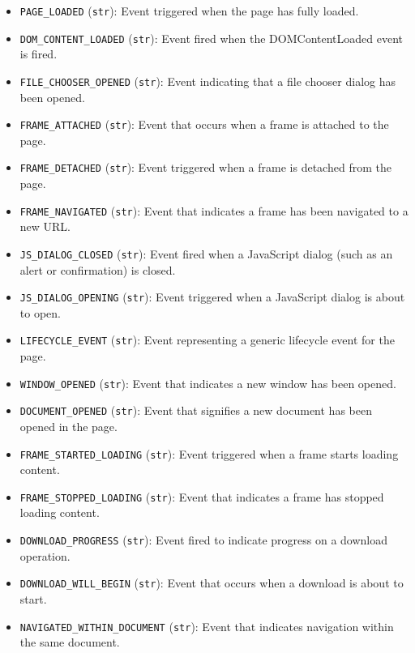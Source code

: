 \documentclass{article}
\begin{document}
\begin{itemize}
    \item \lstinline[style=pythonstyle]|PAGE_LOADED| (\lstinline[style=pythonstyle]|str|): Event triggered when the page has fully loaded.
    \item \lstinline[style=pythonstyle]|DOM_CONTENT_LOADED| (\lstinline[style=pythonstyle]|str|): Event fired when the DOMContentLoaded event is fired.
    \item \lstinline[style=pythonstyle]|FILE_CHOOSER_OPENED| (\lstinline[style=pythonstyle]|str|): Event indicating that a file chooser dialog has been opened.
    \item \lstinline[style=pythonstyle]|FRAME_ATTACHED| (\lstinline[style=pythonstyle]|str|): Event that occurs when a frame is attached to the page.
    \item \lstinline[style=pythonstyle]|FRAME_DETACHED| (\lstinline[style=pythonstyle]|str|): Event triggered when a frame is detached from the page.
    \item \lstinline[style=pythonstyle]|FRAME_NAVIGATED| (\lstinline[style=pythonstyle]|str|): Event that indicates a frame has been navigated to a new URL.
    \item \lstinline[style=pythonstyle]|JS_DIALOG_CLOSED| (\lstinline[style=pythonstyle]|str|): Event fired when a JavaScript dialog (such as an alert or confirmation) is closed.
    \item \lstinline[style=pythonstyle]|JS_DIALOG_OPENING| (\lstinline[style=pythonstyle]|str|): Event triggered when a JavaScript dialog is about to open.
    \item \lstinline[style=pythonstyle]|LIFECYCLE_EVENT| (\lstinline[style=pythonstyle]|str|): Event representing a generic lifecycle event for the page.
    \item \lstinline[style=pythonstyle]|WINDOW_OPENED| (\lstinline[style=pythonstyle]|str|): Event that indicates a new window has been opened.
    \item \lstinline[style=pythonstyle]|DOCUMENT_OPENED| (\lstinline[style=pythonstyle]|str|): Event that signifies a new document has been opened in the page.
    \item \lstinline[style=pythonstyle]|FRAME_STARTED_LOADING| (\lstinline[style=pythonstyle]|str|): Event triggered when a frame starts loading content.
    \item \lstinline[style=pythonstyle]|FRAME_STOPPED_LOADING| (\lstinline[style=pythonstyle]|str|): Event that indicates a frame has stopped loading content.
    \item \lstinline[style=pythonstyle]|DOWNLOAD_PROGRESS| (\lstinline[style=pythonstyle]|str|): Event fired to indicate progress on a download operation.
    \item \lstinline[style=pythonstyle]|DOWNLOAD_WILL_BEGIN| (\lstinline[style=pythonstyle]|str|): Event that occurs when a download is about to start.
    \item \lstinline[style=pythonstyle]|NAVIGATED_WITHIN_DOCUMENT| (\lstinline[style=pythonstyle]|str|): Event that indicates navigation within the same document.
\end{itemize}
\end{document}
